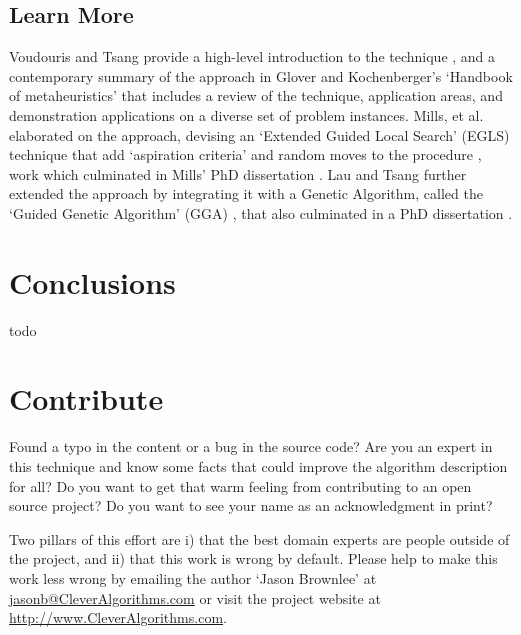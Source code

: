 \documentclass[a4paper, 11pt]{article}
\makeatletter
\newcommand{\myreportauthor}{Jason Brownlee}
\newcommand{\myreportemail}{jasonb@CleverAlgorithms.com}
\newcommand{\myreportwebsite}{http://www.CleverAlgorithms.com}
\makeatother
\begin{document}
\subsection{Learn More}
Voudouris and Tsang provide a high-level introduction to the technique \cite{Voudouris1998}, and a contemporary summary of the approach in Glover and Kochenberger's `Handbook of metaheuristics' \cite{Glover2003a} that includes a review of the technique, application areas, and demonstration applications on a diverse set of problem instances.
Mills, et al. elaborated on the approach, devising an `Extended Guided Local Search' (EGLS) technique that add `aspiration criteria' and random moves to the procedure \cite{Mills2003}, work which culminated in Mills' PhD dissertation \cite{Mills2002}.  
Lau and Tsang further extended the approach by integrating it with a Genetic Algorithm, called the `Guided Genetic Algorithm' (GGA) \cite{Lau1998}, that also culminated in a PhD dissertation \cite{Lau1999}.

% 
% 
\section{Conclusions}
\label{sec:conclusions}
todo

% 
% 
\section{Contribute}
\label{sec:contribute}
Found a typo in the content or a bug in the source code? 
Are you an expert in this technique and know some facts that could improve the algorithm description for all?
Do you want to get that warm feeling from contributing to an open source project? 
Do you want to see your name as an acknowledgment in print?

Two pillars of this effort are i) that the best domain experts are people outside of the project, and ii) that this work is wrong by default. 
Please help to make this work less wrong by emailing the author `\myreportauthor' at \url{\myreportemail} or visit the project website at \url{\myreportwebsite}.



\end{document}
